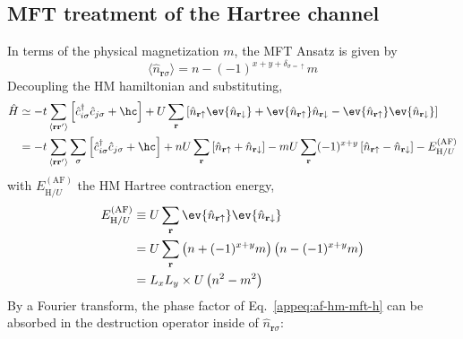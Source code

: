 \subsection{MFT treatment of the Hartree channel}\label{appsubsec:af-hartree-channel}

In terms of the physical magnetization $m$, the MFT Ansatz is given by
\begin{equation}\label{appeq:af-mean-field-ansatz}
	\langle \hat n_{\mathbf{r}\sigma} \rangle = n - (-1)^{x+y+\delta_{\sigma=\uparrow}} m
\end{equation}
Decoupling the HM hamiltonian and substituting,
\begin{align}
	\hat H &\simeq -t \sum_{\langle \mathbf{r} \mathbf{r}' \rangle} \left[
		\hat c_{i\sigma}^\dagger \hat c_{j\sigma} + \hc
	\right] + U \sum_\mathbf{r} \left[
		\hat n_{\mathbf{r}\uparrow} \ev{\hat n_{\mathbf{r}\downarrow}} + \ev{\hat n_{\mathbf{r}\uparrow}} \hat n_{\mathbf{r}\downarrow} - \ev{\hat n_{\mathbf{r}\uparrow}} \ev{\hat n_{\mathbf{r}\downarrow}}
	\right] \nonumber \\
	&= -t \sum_{\langle \mathbf{r}\mathbf{r}' \rangle} \sum_\sigma \left[
		\hat c_{i\sigma}^\dagger \hat c_{j\sigma} + \hc
	\right]
	+ nU \sum_\mathbf{r} \left[
		\hat n_{\mathbf{r}\uparrow} + \hat n_{\mathbf{r}\downarrow}
	\right] - mU \sum_\mathbf{r} (-1)^{x+y} \left[
		\hat n_{\mathbf{r}\uparrow} - \hat n_{\mathbf{r}\downarrow}
	\right] - E_{\mathrm{H}/U}^{(\mathrm{AF})} \label{appeq:af-hm-mft-h}
\end{align}
with $E_{\mathrm{H}/U}^{(\mathrm{AF})}$ the HM Hartree contraction energy,
\begin{align}
	E_{\mathrm{H}/U}^{(\mathrm{AF})} &\equiv U \sum_\mathbf{r} \ev{\hat n_{\mathbf{r}\uparrow}} \ev{\hat n_{\mathbf{r}\downarrow}} \nonumber \\
	&= U \sum_\mathbf{r} \left(
		n + (-1)^{x+y} m
	\right) \left(
		n - (-1)^{x+y} m
	\right) \nonumber \\
	&= L_x L_y \times U \left(
		n^2 - m^2
	\right) \label{appeq:af-hm-hartree-U-Ec}
\end{align}
By a Fourier transform, the phase factor of Eq.~\eqref{appeq:af-hm-mft-h} can be absorbed in the destruction operator inside of $\hat n_{\mathbf{r}\sigma}$:
